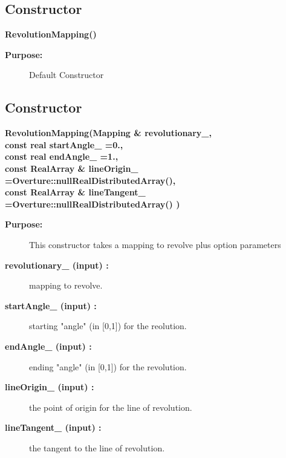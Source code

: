 \subsection{Constructor}
 
\newlength{\RevolutionMappingIncludeArgIndent}
\begin{flushleft} \textbf{%
\settowidth{\RevolutionMappingIncludeArgIndent}{RevolutionMapping(}%
RevolutionMapping() 
}\end{flushleft}
\begin{description}
\item[{\bf Purpose:}]  Default Constructor
\end{description}
\subsection{Constructor}
 
\begin{flushleft} \textbf{%
\settowidth{\RevolutionMappingIncludeArgIndent}{RevolutionMapping(}%
RevolutionMapping(Mapping \& revolutionary\_, \\ 
\hspace{\RevolutionMappingIncludeArgIndent}const real startAngle\_  =0., \\ 
\hspace{\RevolutionMappingIncludeArgIndent}const real endAngle\_  =1.,\\ 
const RealArray \& lineOrigin\_  =Overture::nullRealDistributedArray(),\\ 
const RealArray \& lineTangent\_  =Overture::nullRealDistributedArray()
\hspace{\RevolutionMappingIncludeArgIndent})
}\end{flushleft}
\begin{description}
\item[{\bf Purpose:}]  This constructor takes a mapping to revolve plus option parameters
\item[{\bf revolutionary\_ (input) :}]  mapping to revolve.
\item[{\bf startAngle\_ (input) :}]  starting "angle" (in [0,1]) for the reolution.
\item[{\bf endAngle\_ (input) :}]  ending "angle" (in [0,1]) for the revolution.
\item[{\bf lineOrigin\_ (input) :}]  the point of origin for the line of revolution.
\item[{\bf lineTangent\_ (input) :}]  the tangent to the line of revolution.
\end{description}
